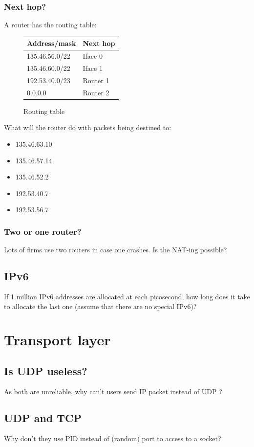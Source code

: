 \documentclass[11pt]{article}
\begin{document}
\subsubsection{Next hop?}
A router has the routing table:
  \begin{figure}[h]
  \centering
    \begin{tabular}{ll}
      \textbf{Address/mask} & Next hop \\ \hline
      135.46.56.0/22        & Iface 0  \\
      135.46.60.0/22        & Iface 1  \\
      192.53.40.0/23        & Router 1 \\
      0.0.0.0               & Router 2 \\ \hline
    \end{tabular}
  \caption{Routing table}
  \end{figure}
What will the router do with packets being destined to:
\begin{itemize}
  \item 135.46.63.10  %
  \item 135.46.57.14  %
  \item 135.46.52.2   %
  \item 192.53.40.7   %
  \item 192.53.56.7   %
\end{itemize}
\subsubsection{Two or one router?}
Lots of firms use two routers in case one crashes. Is the NAT-ing possible? %

\subsection{IPv6}
If 1 million IPv6 addresses are allocated at each picosecond, how long does it take to allocate the last one (assume that there are no special IPv6)? %

\section{Transport layer}
\subsection{Is UDP useless?}
As both are unreliable, why can't users send IP packet instead of UDP ?

\subsection{UDP and TCP}
Why don't they use PID instead of (random) port to access to a socket?
\end{document}
